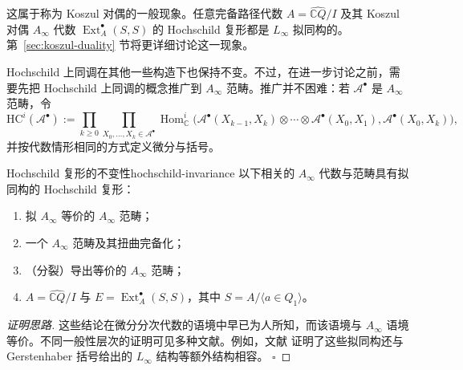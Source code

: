 \begin{example}
这属于称为 Koszul 对偶的一般现象。任意完备路径代数 $A=\widehat{\mathbb C Q}/I$ 及其 Koszul 对偶 $A_\infty$ 代数 $\operatorname{Ext}^{\bullet}_A(S,S)$ 的 Hochschild 复形都是 $L_\infty$ 拟同构的。第~\ref{sec:koszul-duality} 节将更详细讨论这一现象。
\end{example}

Hochschild 上同调在其他一些构造下也保持不变。不过，在进一步讨论之前，需要先把 Hochschild 上同调的概念推广到 $A_\infty$ 范畴。推广并不困难：若 $\mathcal A^{\bullet}$ 是 $A_\infty$ 范畴，令
\[
  \mathrm{HC}^{i}(\mathcal A^{\bullet})
  :=\prod_{k\geq0}\prod_{X_0,\ldots,X_k\in\mathcal A^{\bullet}}
  \operatorname{Hom}^{i}_{\mathbb C}\bigl(
  \mathcal A^{\bullet}(X_{k-1},X_k)\otimes\cdots\otimes
  \mathcal A^{\bullet}(X_0,X_1),\mathcal A^{\bullet}(X_0,X_k)\bigr),
\]
并按代数情形相同的方式定义微分与括号。

\begin{theorem}{Hochschild 复形的不变性}{hochschild-invariance}
以下相关的 $A_\infty$ 代数与范畴具有拟同构的 Hochschild 复形：
\begin{enumerate}[label=(\roman*)]
  \item 拟 $A_\infty$ 等价的 $A_\infty$ 范畴；
  \item 一个 $A_\infty$ 范畴及其扭曲完备化；
  \item （分裂）导出等价的 $A_\infty$ 范畴；
  \item $A=\widehat{\mathbb C Q}/I$ 与 $E=\operatorname{Ext}^{\bullet}_A(S,S)$，其中 $S=A/\langle a\in Q_1\rangle$。
\end{enumerate}
\end{theorem}
\begin{proof}[证明思路]
这些结论在微分分次代数的语境中早已为人所知，而该语境与 $A_\infty$ 语境等价。不同一般性层次的证明可见多种文献。例如，文献 证明了这些拟同构还与 Gerstenhaber 括号给出的 $L_\infty$ 结构等额外结构相容。
\hfill$\square$
\end{proof}

